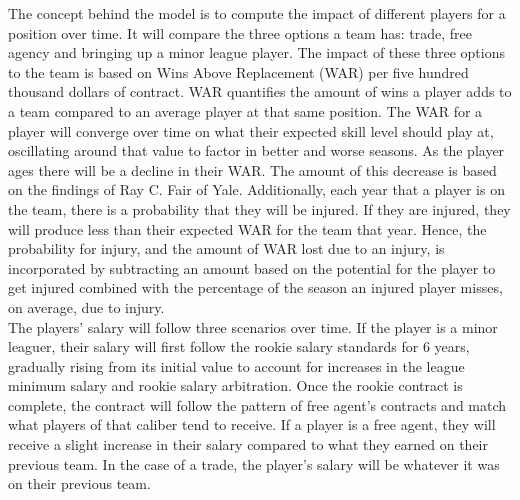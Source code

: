 \documentclass[12pt]{article}
\newcommand\tab[1][1cm]{\hspace*{#1}}
\begin{document}
	\tab The concept behind the model is to compute the impact of different players for a position over time.  It will compare the three options a team has: trade, free agency and bringing up a minor league player.  The impact of these three options to the team is based on Wins Above Replacement (WAR) per five hundred  thousand dollars of contract.  WAR quantifies the amount of wins a player adds to a team compared to an average player at that same position.  The WAR for a player will converge over time on what their expected skill level should play at, oscillating around that value to factor in better and worse seasons.  As the player ages there will be a decline in their WAR.  The amount of this decrease is based on the findings of Ray C. Fair of Yale.  Additionally, each year that a player is on the team, there is a probability that they will be injured.  If they are injured, they will produce less than their expected WAR for the team that year.  Hence, the probability for injury, and the amount of WAR lost due to an injury, is incorporated by subtracting an amount based on the potential for the player to get injured combined with the percentage of the season an injured player misses, on average, due to injury.  \\
	\tab The players' salary will follow three scenarios over time.  If the player is a minor leaguer, their salary will first follow the rookie salary standards for 6 years, gradually rising from its initial value to account for increases in the league minimum salary and rookie salary arbitration.  Once the rookie contract is complete, the contract will follow the pattern of free agent's contracts and match what players of that caliber tend to receive.  If a player is a free agent, they will receive a slight increase in their salary compared to what they earned on their previous team.  In the case of a trade, the player's salary will be whatever it was on their previous team.  \\
\end{document}
